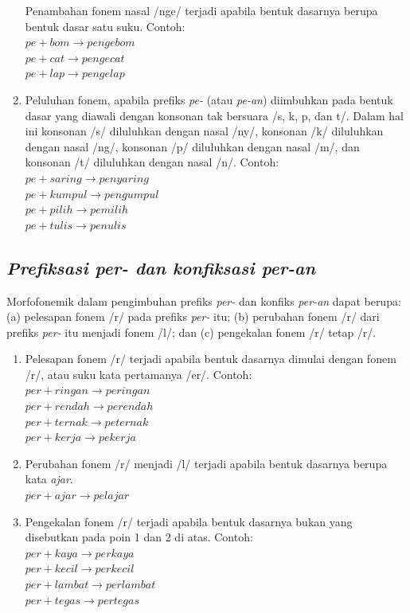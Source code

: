\begin{enumerate}
	Penambahan fonem nasal /nge/ terjadi apabila bentuk dasarnya berupa bentuk dasar satu suku. Contoh:\\
	$pe + bom \rightarrow pengebom$\\
	$pe + cat \rightarrow pengecat$\\
	$pe + lap \rightarrow pengelap$
	
	\item Peluluhan fonem, apabila prefiks \textit{pe-} (atau \textit{pe-an}) diimbuhkan pada bentuk dasar yang diawali dengan konsonan tak bersuara /s, k, p, dan t/. Dalam hal ini konsonan /s/ diluluhkan dengan nasal /ny/, konsonan /k/ diluluhkan dengan nasal /ng/, konsonan /p/ diluluhkan dengan nasal /m/, dan konsonan /t/ diluluhkan dengan nasal /n/. Contoh:\\
	$pe + saring \rightarrow penyaring$\\
	$pe + kumpul \rightarrow pengumpul$\\
	$pe + pilih \rightarrow pemilih$\\
	$pe + tulis \rightarrow penulis$
	
\end{enumerate}


\subsection{\textit{Prefiksasi per- dan konfiksasi per-an}}
\label{sec:prefiksasiPer-}

Morfofonemik dalam pengimbuhan prefiks \textit{per-} dan konfiks \textit{per-an} dapat berupa: (a) pelesapan fonem /r/ pada prefiks \textit{per-} itu; (b) perubahan fonem /r/ dari prefiks \textit{per-} itu menjadi fonem /l/; dan (c) pengekalan fonem /r/ tetap /r/.

\begin{enumerate}
	\item Pelesapan fonem /r/ terjadi apabila bentuk dasarnya dimulai dengan fonem /r/, atau suku kata pertamanya /er/. Contoh:\\
	$per + ringan \rightarrow peringan$\\
	$per + rendah \rightarrow perendah$\\
	$per + ternak \rightarrow peternak$\\
	$per + kerja \rightarrow pekerja$
	
	\item Perubahan fonem /r/ menjadi /l/ terjadi apabila bentuk dasarnya berupa kata \textit{ajar}.\\
	$per + ajar \rightarrow pelajar$
	
	\item Pengekalan fonem /r/ terjadi apabila bentuk dasarnya bukan yang disebutkan pada poin 1 dan 2 di atas. Contoh:\\
	$per + kaya \rightarrow perkaya$\\
	$per + kecil \rightarrow perkecil$\\
	$per + lambat \rightarrow perlambat$\\
	$per + tegas \rightarrow pertegas$	
	
\end{enumerate}


